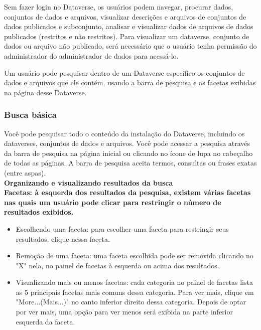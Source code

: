 \documentclass[12pt,hidelinks]{article}
\begin{document}
\qquad Sem fazer login no Dataverse, os usuários podem navegar, procurar dados, conjuntos de dados e arquivos, visualizar descrições e arquivos de conjuntos de dados publicados e subconjunto, analisar e visualizar dados de arquivos de dados publicados (restritos e não restritos). Para visualizar um dataverse, conjunto de dados ou arquivo não publicado, será necessário que o usuário tenha permissão do administrador do administrador de dados para acessá-lo.

Um usuário pode pesquisar dentro de um Dataverse específico os conjuntos de dados e arquivos que ele contém, usando a barra de pesquisa e as facetas exibidas na página desse Dataverse.
	
	    \subsubsection{Busca básica}
	    
\qquad Você pode pesquisar todo o conteúdo da instalação do Dataverse, incluindo os dataverses, conjuntos de dados e arquivos. Você pode acessar a pesquisa através da barra de pesquisa na página inicial ou clicando no ícone de lupa no cabeçalho de todas as páginas. A barra de pesquisa aceita termos, consultas ou frases exatas (entre aspas).\\
	    
	    
 \textbf{Organizando e visualizando resultados da busca}\\
	        
	        
\textbf {Facetas: à esquerda dos resultados da pesquisa, existem várias facetas nas quais um usuário pode clicar para restringir o número de resultados exibidos.}

\begin{itemize}
\item Escolhendo uma faceta: para escolher uma faceta para restringir seus resultados, clique nessa faceta.
\item Remoção de uma faceta: uma faceta escolhida pode ser removida clicando no "X" nela, no painel de facetas à esquerda ou acima dos resultados.
\item Visualizando mais ou menos facetas: cada categoria no painel de facetas lista as 5 principais facetas mais comuns dessa categoria. Para ver mais, clique em "More...(Mais...)" no canto inferior direito dessa categoria. Depois de optar por ver mais, uma opção para ver menos será exibida na parte inferior esquerda da faceta.
\end{itemize}
\end{document}
